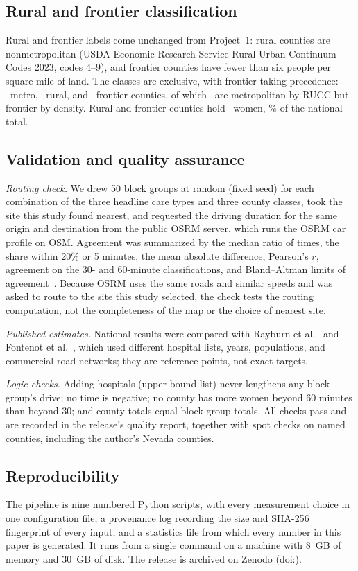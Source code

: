 \documentclass[10pt,twocolumn,letterpaper]{article}
\begin{document}
\subsection{Rural and frontier classification}
Rural and frontier labels come unchanged from Project~1: rural counties are nonmetropolitan (USDA Economic Research Service Rural-Urban Continuum Codes 2023, codes 4--9), and frontier counties have fewer than six people per square mile of land. The classes are exclusive, with frontier taking precedence: \NMetro\ metro, \NRural\ rural, and \NFrontier\ frontier counties, of which \NMetroFrontier\ are metropolitan by RUCC but frontier by density. Rural and frontier counties hold \WomenRF\ women, \WomenRFShare\% of the national total.

\subsection{Validation and quality assurance}
\emph{Routing check.} We drew 50 block groups at random (fixed seed) for each combination of the three headline care types and three county classes, took the site this study found nearest, and requested the driving duration for the same origin and destination from the public OSRM server, which runs the OSRM car profile on OSM. Agreement was summarized by the median ratio of times, the share within 20\% or 5 minutes, the mean absolute difference, Pearson's $r$, agreement on the 30- and 60-minute classifications, and Bland--Altman limits of agreement~\cite{bland1986}. Because OSRM uses the same roads and similar speeds and was asked to route to the site this study selected, the check tests the routing computation, not the completeness of the map or the choice of nearest site.

\emph{Published estimates.} National results were compared with Rayburn et al.~\cite{rayburn2012} and Fontenot et al.~\cite{fontenot2024}, which used different hospital lists, years, populations, and commercial road networks; they are reference points, not exact targets.

\emph{Logic checks.} Adding hospitals (upper-bound list) never lengthens any block group's drive; no time is negative; no county has more women beyond 60 minutes than beyond 30; and county totals equal block group totals. All checks pass and are recorded in the release's quality report, together with spot checks on named counties, including the author's Nevada counties.

\subsection{Reproducibility}
The pipeline is nine numbered Python scripts, with every measurement choice in one configuration file, a provenance log recording the size and SHA-256 fingerprint of every input, and a statistics file from which every number in this paper is generated. It runs from a single command on a machine with 8~GB of memory and 30~GB of disk. The release is archived on Zenodo (doi:\DOI).
\end{document}

